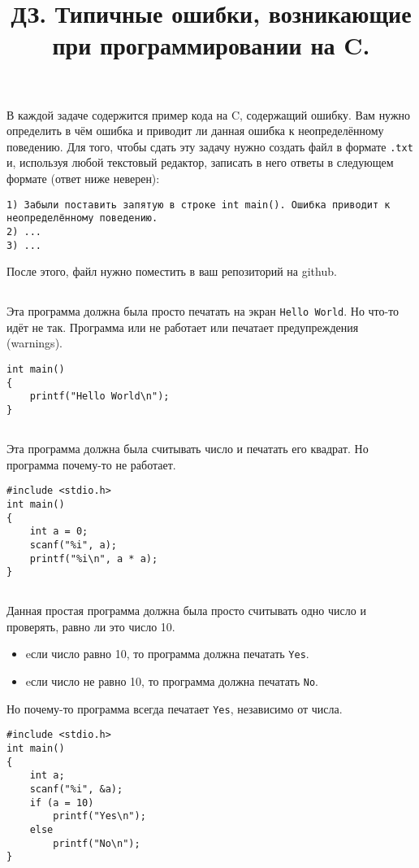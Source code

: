 \documentclass{article}
\begin{document}
\title{ДЗ. Типичные ошибки, возникающие при программировании на C. \vspace{-5ex}}\date{}\maketitle

\noindent В каждой задаче содержится пример кода на C, содержащий ошибку. Вам нужно определить в чём ошибка и приводит ли данная ошибка к неопределённому поведению.
Для того, чтобы сдать эту задачу нужно создать файл в формате \texttt{.txt} и, используя любой текстовый редактор, записать в него ответы в следующем формате (ответ ниже неверен):
\begin{verbatim}
1) Забыли поставить запятую в строке int main(). Ошибка приводит к неопределённому поведению.
2) ...
3) ...
\end{verbatim} 
После этого, файл нужно поместить в ваш репозиторий на github.


\subsection{}
Эта программа должна была просто печатать на экран \texttt{Hello World}. Но что-то идёт не так. Программа или не работает или печатает предупреждения (warnings).
\begin{lstlisting}
int main()
{
    printf("Hello World\n");
}
\end{lstlisting}

\subsection{}
Эта программа должна была считывать число и печатать его квадрат.
Но программа почему-то не работает.
\begin{lstlisting}
#include <stdio.h>
int main()
{
    int a = 0;
    scanf("%i", a);
    printf("%i\n", a * a);
}
\end{lstlisting}

\subsection{}
Данная простая программа должна была просто считывать одно число и проверять, равно ли это число 10.
\begin{itemize}
\item eсли число равно 10, то программа должна печатать \texttt{Yes}.
\item eсли число не равно 10, то программа должна печатать \texttt{No}.
\end{itemize}
Но почему-то программа всегда печатает \texttt{Yes}, независимо от числа.
\begin{lstlisting}
#include <stdio.h>
int main()
{
    int a;
    scanf("%i", &a);
    if (a = 10)
        printf("Yes\n");
    else
        printf("No\n");
}
\end{lstlisting}
\end{document}
